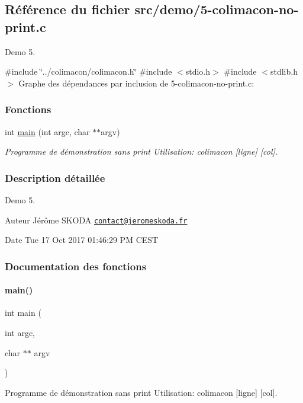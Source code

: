 \hypertarget{5-colimacon-no-print_8c}{}\subsection{Référence du fichier src/demo/5-\/colimacon-\/no-\/print.c}
\label{5-colimacon-no-print_8c}


Demo 5.  


{\ttfamily \#include \char`\"{}../colimacon/colimacon.\+h\char`\"{}}\newline
{\ttfamily \#include $<$stdio.\+h$>$}\newline
{\ttfamily \#include $<$stdlib.\+h$>$}\newline
Graphe des dépendances par inclusion de 5-\/colimacon-\/no-\/print.c\+:
\subsubsection*{Fonctions}
\begin{DoxyCompactItemize}
\item 
int \hyperlink{5-colimacon-no-print_8c_a3c04138a5bfe5d72780bb7e82a18e627}{main} (int argc, char $\ast$$\ast$argv)
\begin{DoxyCompactList}\small\item\em Programme de démonstration sans print Utilisation\+: colimacon \mbox{[}ligne\mbox{]} \mbox{[}col\mbox{]}. \end{DoxyCompactList}\end{DoxyCompactItemize}


\subsubsection{Description détaillée}
Demo 5. 

\begin{DoxyAuthor}{Auteur}
Jérôme S\+K\+O\+DA \href{mailto:contact@jeromeskoda.fr}{\tt contact@jeromeskoda.\+fr} 
\end{DoxyAuthor}
\begin{DoxyDate}{Date}
Tue 17 Oct 2017 01\+:46\+:29 PM C\+E\+ST 
\end{DoxyDate}


\subsubsection{Documentation des fonctions}
\mbox{\label{5-colimacon-no-print_8c_a3c04138a5bfe5d72780bb7e82a18e627}} 
\paragraph{\texorpdfstring{main()}{main()}}
{\footnotesize\ttfamily int main (\begin{DoxyParamCaption}\item[{int}]{argc,  }\item[{char $\ast$$\ast$}]{argv }\end{DoxyParamCaption})}



Programme de démonstration sans print Utilisation\+: colimacon \mbox{[}ligne\mbox{]} \mbox{[}col\mbox{]}. 

